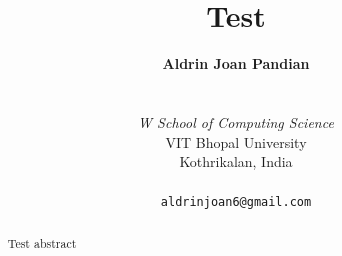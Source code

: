\documentclass{article}
\makeatletter
\newcommand{\IEEEauthorblockN}[1]{\begin{tabular}{@{}c@{}}\textbf{#1}\end{tabular}\\}
\newcommand{\IEEEauthorblockA}[1]{\begin{tabular}{@{}c@{}}\itshape #1\end{tabular}\\}
\makeatother
\begin{document}
\author{\IEEEauthorblockN{Aldrin Joan Pandian}
\IEEEauthorblockA{W School of Computing Science\\VIT Bhopal University\\Kothrikalan, India}
\texttt{aldrinjoan6@gmail.com}}
\title{Test}
\maketitle
\begin{abstract}
Test abstract
\end{abstract}
\end{document}
